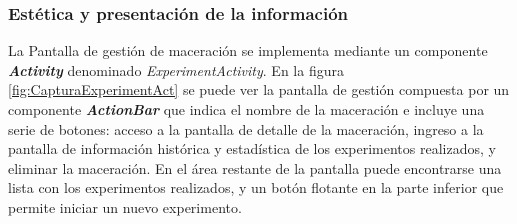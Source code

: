             \subsubsection{Estética y presentación de la información}
                \par La Pantalla de gestión de maceración se implementa mediante un componente \textbf{\textit{\gls{Activity}}} denominado \textit{ExperimentActivity}. En la figura \ref{fig:CapturaExperimentAct} se puede ver la pantalla de gestión compuesta por un componente \textbf{\textit{\gls{ActionBar}}} que indica el nombre de la maceración e incluye una serie de botones: acceso a la pantalla de detalle de la maceración, ingreso a la pantalla de información histórica y estadística de los experimentos realizados, y  eliminar la maceración. En el área restante de la pantalla puede encontrarse una lista con los experimentos realizados, y un botón flotante en la parte inferior que permite iniciar un nuevo experimento. %
